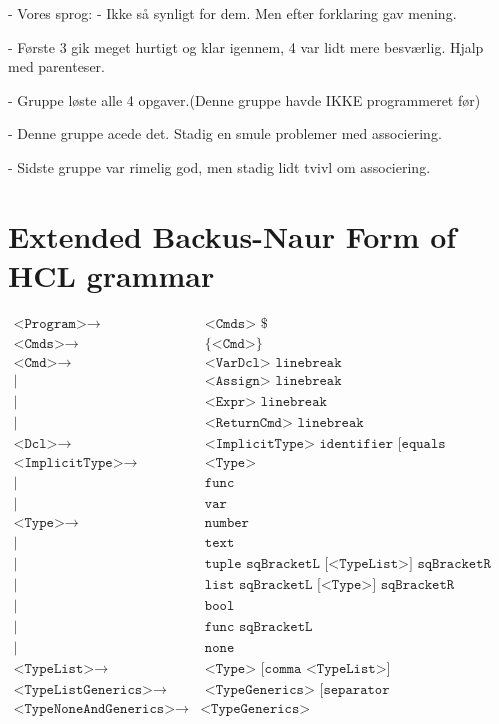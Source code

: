 - Vores sprog: 
- Ikke så synligt for dem. Men efter forklaring gav mening.

- Første 3 gik meget hurtigt og klar igennem, 4 var lidt mere besværlig. Hjalp med parenteser.

- Gruppe løste alle 4 opgaver.(Denne gruppe havde IKKE programmeret før)

- Denne gruppe acede det. Stadig en smule problemer med associering.

- Sidste gruppe var rimelig god, men stadig lidt tvivl om associering.

\section{Extended Backus-Naur Form of HCL grammar}
\label{AppendixEBNF}
\begin{align*}
	\texttt{<Program>}\to & \texttt{ <Cmds> \$}\\
	\texttt{<Cmds>}\to & \texttt{ \{<Cmd>\}}\\
	\texttt{<Cmd>}\to & \texttt{ <VarDcl> linebreak}\\
	| & \texttt{ <Assign> linebreak}\\
	| & \texttt{ <Expr> linebreak}\\
	| & \texttt{ <ReturnCmd> linebreak}\\
	\texttt{<Dcl>}\to & \texttt{ <ImplicitType> identifier [equals <DclValue>]}\\
	\texttt{<ImplicitType>}\to & \texttt{ <Type>}\\
	| & \texttt{ func}\\
	| & \texttt{ var}\\
	\texttt{<Type>}\to & \texttt{ number}\\
	| & \texttt{ text}\\
	| & \texttt{ tuple sqBracketL [<TypeList>] sqBracketR}\\
	| & \texttt{ list sqBracketL [<Type>] sqBracketR}\\
	| & \texttt{ bool}\\
	| & \texttt{ func sqBracketL [<TypeListNoneAndGenerics>] sqBracketR}\\
	| & \texttt{ none}\\
	\texttt{<TypeList>}\to & \texttt{ <Type> [comma <TypeList>]}\\
	\texttt{<TypeListGenerics>}\to & \texttt{ <TypeGenerics> [separator <TypeListGenerics>] }\\
	\texttt{<TypeNoneAndGenerics>}\to & \texttt{<TypeGenerics>}\\

\end{align*}
